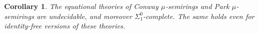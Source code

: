 \documentclass[a4paper,10pt]{amsart}
\newtheorem{theorem}{Theorem}
\newtheorem{corollary}[theorem]{Corollary}
\theoremstyle{definition}
\newtheorem{definition}[theorem]{Definition}
\newcommand{\id}{\mathsf{init}}
\newcommand{\basicax}{\mu\mathsf{S}}
\newcommand{\idem}{\mathsf{idem}}
\newcommand{\ind}{\mathsf{lfp}}
\newcommand{\basicaxidfree}{\basicax_{\not {\hspace{.1em}1}}}
\renewcommand{\id}[1]{#1^i}
\begin{document}
\begin{corollary}
    The equational theories of Conway $\mu$-semirings and Park $\mu$-semirings are undecidable, and moreover $\Sigma^0_1$-complete.
    The same holds even for identity-free versions of these theories.
\end{corollary}








\end{document}

